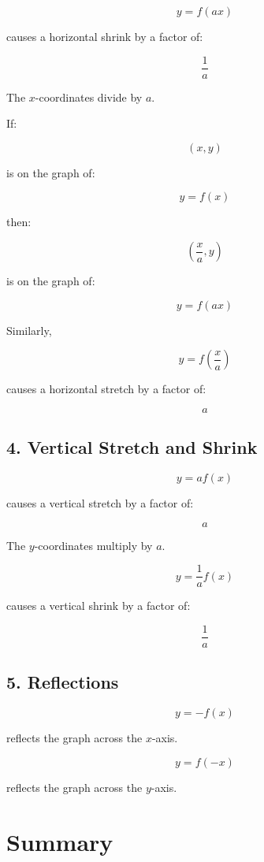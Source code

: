 \documentclass[11pt]{article}
\begin{document}
\[
y=f(ax)
\]

causes a horizontal shrink by a factor of:

\[
\frac1a
\]

The $x$-coordinates divide by $a$.

If:

\[
(x,y)
\]

is on the graph of:

\[
y=f(x)
\]

then:

\[
\left(\frac{x}{a},y\right)
\]

is on the graph of:

\[
y=f(ax)
\]

\vspace{0.3cm}

Similarly,

\[
y=f\left(\frac{x}{a}\right)
\]

causes a horizontal stretch by a factor of:

\[
a
\]

\subsection*{4. Vertical Stretch and Shrink}

\[
y=af(x)
\]

causes a vertical stretch by a factor of:

\[
a
\]

The $y$-coordinates multiply by $a$.

\vspace{0.3cm}

\[
y=\frac1a f(x)
\]

causes a vertical shrink by a factor of:

\[
\frac1a
\]

\subsection*{5. Reflections}

\[
y=-f(x)
\]

reflects the graph across the $x$-axis.

\vspace{0.3cm}

\[
y=f(-x)
\]

reflects the graph across the $y$-axis.

\section*{Summary}
\end{document}

